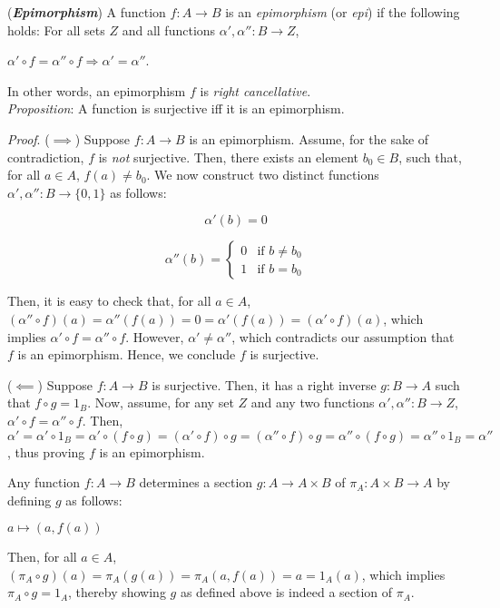 \begin{xca}
(\emph{\textbf{Epimorphism}}) A function $f : A \to B$ is an \emph{epimorphism}
(or \emph{epi}) if the following holds: For all sets $Z$ and all functions
$\alpha ', \alpha '' : B \to Z$,
\begin{center}
$\alpha ' \circ f = \alpha '' \circ f \Longrightarrow \alpha ' = \alpha ''$.
\end{center}
In other words, an epimorphism $f$ is \emph{right cancellative}.\\

\emph{Proposition}: A function is surjective iff it is an epimorphism.

\emph{Proof}. ($\implies$) Suppose $f: A \to B$ is an epimorphism. Assume, for
the sake of contradiction, $f$ is \emph{not} surjective. Then, there exists an
element $b_0 \in B$, such that, for all $a \in A$, $f(a) \neq b_0$. We now
construct two distinct functions $\alpha', \alpha'' : B \to \{ 0, 1 \}$ as
follows:
\begin{center}
\[
\alpha'(b) = 0
\]

\[
\alpha''(b) =
    \begin{cases}
        0 & \text{if } b \neq b_0 \\
        1 & \text{if } b = b_0
    \end{cases}
\]
\end{center}
Then, it is easy to check that, for all $a \in A$,
$(\alpha'' \circ f)(a) = \alpha''(f(a)) = 0 = \alpha'(f(a)) = (\alpha' \circ
f)(a)$, which implies $\alpha' \circ f = \alpha'' \circ f$. However, $\alpha'
\neq \alpha''$, which contradicts our assumption that $f$ is an epimorphism.
Hence, we conclude $f$ is surjective.

($\impliedby$) Suppose $f: A \to B$ is surjective. Then, it has a right inverse
$g: B \to A$ such that $f \circ g = 1_B$. Now, assume, for any set $Z$ and any
two functions $\alpha', \alpha'': B \to Z$, $\alpha' \circ f = \alpha'' \circ
f$. Then, $\alpha' = \alpha' \circ 1_B = \alpha' \circ (f \circ g) = (\alpha'
\circ f) \circ g = (\alpha'' \circ f) \circ g = \alpha'' \circ (f \circ g) =
\alpha'' \circ 1_B = \alpha''$, thus proving $f$ is an epimorphism.
\end{xca}

\begin{xca}
Any function $f: A \to B$ determines a section $g: A \to A \times B$ of $\pi_A:
A \times B \to A$ by defining $g$ as follows:
\begin{center}
    $a \mapsto (a, f(a))$
\end{center}
Then, for all $a \in A$, $(\pi_A \circ g)(a) = \pi_A(g(a)) = \pi_A(a, f(a)) =
a = 1_A(a)$, which implies $\pi_A \circ g = 1_A$, thereby showing $g$ as
defined above is indeed a section of $\pi_A$.
\end{xca}

